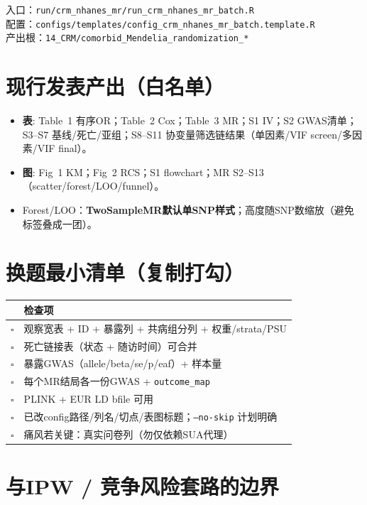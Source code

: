 \documentclass[11pt,a4paper]{article}
\begin{document}
\noindent
入口：\texttt{run/crm\_nhanes\_mr/run\_crm\_nhanes\_mr\_batch.R}\\
配置：\texttt{configs/templates/config\_crm\_nhanes\_mr\_batch.template.R}\\
产出根：\texttt{14\_CRM/comorbid\_Mendelia\_randomization\_*}

\section{现行发表产出（白名单）}

\begin{itemize}
  \item \textbf{表}: Table~1 有序OR；Table~2 Cox；Table~3 MR；S1 IV；S2 GWAS清单；S3--S7 基线/死亡/亚组；S8--S11 协变量筛选链结果（单因素/VIF screen/多因素/VIF final）。
  \item \textbf{图}: Fig~1 KM；Fig~2 RCS；S1 flowchart；MR S2--S13（scatter/forest/LOO/funnel）。
  \item Forest/LOO：\textbf{TwoSampleMR默认单SNP样式}；高度随SNP数缩放（避免标签叠成一团）。
\end{itemize}

\section{换题最小清单（复制打勾）}

\begin{tabularx}{\textwidth}{@{}L{0.08\textwidth}X@{}}
\toprule
\textbf{} & \textbf{检查项} \\
\midrule
$\square$ & 观察宽表 + ID + 暴露列 + 共病组分列 + 权重/strata/PSU \\
$\square$ & 死亡链接表（状态 + 随访时间）可合并 \\
$\square$ & 暴露GWAS（allele/beta/se/p/eaf）+ 样本量 \\
$\square$ & 每个MR结局各一份GWAS + \texttt{outcome\_map} \\
$\square$ & PLINK + EUR LD bfile 可用 \\
$\square$ & 已改config路径/列名/切点/表图标题；\texttt{--no-skip} 计划明确 \\
$\square$ & 痛风若关键：真实问卷列（勿仅依赖SUA代理） \\
\bottomrule
\end{tabularx}

\section{与IPW / 竞争风险套路的边界}
\end{document}
